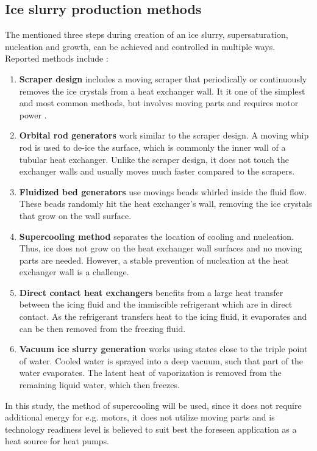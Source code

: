 \subsection{Ice slurry production methods}

The mentioned three steps during creation of an ice slurry, supersaturation, nucleation and growth, can be achieved and controlled in multiple ways. Reported methods include \citep{kauffeld_handbooks_2005, zhang_overview_2012, mouneer_heat_2010}:
\begin{enumerate}
  \item \textbf{Scraper design} includes a moving scraper that periodically or continuously removes the ice crystals from a heat exchanger wall. It it one of the simplest and most common methods, but involves moving parts and requires motor power \citep{ernst_influence_2016}. 
  \item \textbf{Orbital rod generators}
    work similar to the scraper design. A moving whip rod is used to de-ice the surface, which is commonly the inner wall of a tubular heat exchanger. Unlike the scraper design, it does not touch the exchanger walls and usually moves much faster compared to the scrapers.
  \item \textbf{Fluidized bed generators}
    use movings beads whirled inside the fluid flow. These beads randomly hit the heat exchanger's wall, removing the ice crystals that grow on the wall surface.
  \item \textbf{Supercooling method} separates the location of cooling and nucleation. Thus, ice does not grow on the heat exchanger wall surfaces and no moving parts are needed. However, a stable prevention of nucleation at the heat exchanger wall is a challenge.
  \item \textbf{Direct contact heat exchangers} benefits from a large heat transfer between the icing fluid and the immiscible refrigerant which are in direct contact. As the refrigerant transfers heat to the icing fluid, it evaporates and can be then removed from the freezing fluid.
  \item \textbf{Vacuum ice slurry generation} works using states close to the triple point of water. Cooled water is sprayed into a deep vacuum, such that part of the water evaporates. The latent heat of vaporization is removed from the remaining liquid water, which then freezes. 
\end{enumerate}

In this study, the method of supercooling will be used, since it does not require additional energy for e.g. motors, it does not utilize moving parts and is technology readiness level is believed to suit best the foreseen application as a heat source for heat pumps.


